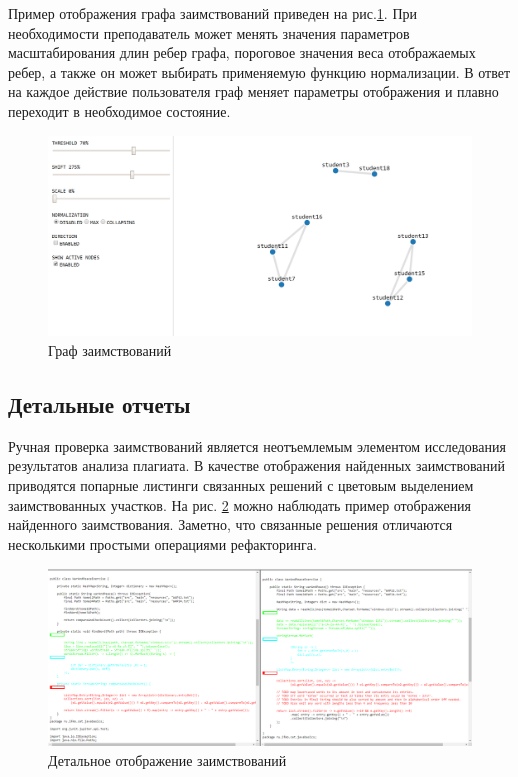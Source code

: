 \documentclass[a4paper,14pt]{extarticle}
\begin{document}
Пример отображения графа заимствований приведен на рис.\ref{fig:graph}. При необходимости преподаватель может менять значения параметров масштабирования длин ребер графа, пороговое значения веса отображаемых ребер, а также он может выбирать применяемую функцию нормализации. В ответ на каждое действие пользователя граф меняет параметры отображения и плавно переходит в необходимое состояние.

\begin{figure}[h!]
\centering
\includegraphics[width=1.0\textwidth]{graph.png}
\caption{Граф заимствований}
\label{fig:graph}
\end{figure}

\subsection{Детальные отчеты}

Ручная проверка заимствований является неотъемлемым элементом исследования результатов анализа плагиата. В качестве отображения найденных заимствований приводятся попарные листинги связанных решений с цветовым выделением заимствованных участков. На рис. \ref{fig:diff} можно наблюдать пример отображения найденного заимствования. Заметно, что связанные решения отличаются несколькими простыми операциями рефакторинга.

\begin{figure}[h!]
\centering
\includegraphics[width=1.0\textwidth]{plagiarism_match.png}
\caption{Детальное отображение заимствований}
\label{fig:diff}
\end{figure}
\end{document}
